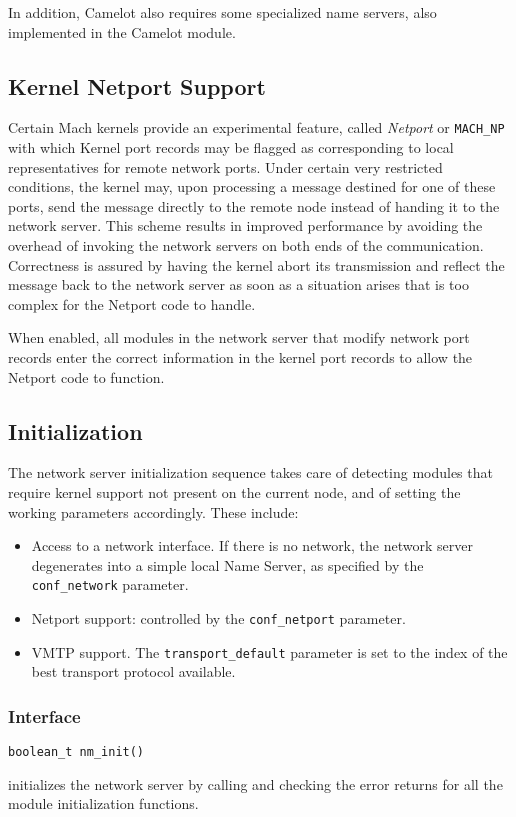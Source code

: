 In addition, Camelot also requires some specialized name servers, also
implemented in the Camelot module.

\subsection{Kernel Netport Support}
Certain Mach kernels provide an experimental feature, called {\it
Netport} or \verb"MACH_NP" with which Kernel port records may be
flagged as corresponding to local representatives for remote network
ports. Under certain very restricted conditions, the kernel may, upon
processing a message destined for one of these ports, send the message
directly to the remote node instead of handing it to the network
server. This scheme results in improved performance by avoiding the
overhead of invoking the network servers on both ends of the
communication. Correctness is assured by having the kernel abort its
transmission and reflect the message back to the network server as
soon as a situation arises that is too complex for the Netport code to
handle.

When enabled, all modules in the network server that modify network
port records enter the correct information in the kernel port records
to allow the Netport code to function.

\subsection{Initialization}
The network server initialization sequence takes care of detecting
modules that require kernel support not present on the current node,
and of setting the working parameters accordingly. These include:
\begin{itemize}
\item Access to a network interface. If there is no network, the
network server degenerates into a simple local Name Server, as
specified by the \verb"conf_network" parameter.

\item Netport support: controlled by the \verb"conf_netport"
parameter.

\item VMTP support. The \verb"transport_default" parameter is set to
the index of the best transport protocol available.
\end{itemize}

\subsubsection{Interface}
\begin{verbatim}
boolean_t nm_init()
\end{verbatim}
initializes the network server by calling and checking the error returns
for all the module initialization functions.

